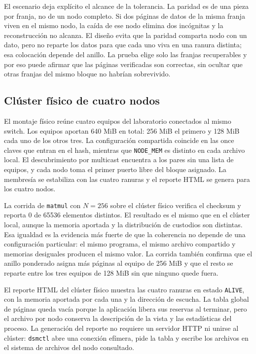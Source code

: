 El escenario deja explícito el alcance de la tolerancia. La paridad es de una pieza por franja, no de un nodo completo. Si dos páginas de datos de la misma franja viven en el mismo nodo, la caída de ese nodo elimina dos incógnitas y la reconstrucción no alcanza. El diseño evita que la paridad comparta nodo con un dato, pero no reparte los datos para que cada uno viva en una ranura distinta; esa colocación depende del anillo. La prueba elige solo las franjas recuperables y por eso puede afirmar que las páginas verificadas son correctas, sin ocultar que otras franjas del mismo bloque no habrían sobrevivido.

\subsection{Clúster físico de cuatro nodos}\label{sec:cluster-fisico}

El montaje físico reúne cuatro equipos del laboratorio conectados al mismo switch. Los equipos aportan 640 MiB en total: 256 MiB el primero y 128 MiB cada uno de los otros tres. La configuración compartida coincide en las once claves que entran en el hash, mientras que \texttt{NODE\_MEM} es distinto en cada archivo local. El descubrimiento por multicast encuentra a los pares sin una lista de equipos, y cada nodo toma el primer puerto libre del bloque asignado. La membresía se estabiliza con las cuatro ranuras y el reporte HTML se genera para los cuatro nodos.

La corrida de \texttt{matmul} con $N=256$ sobre el clúster físico verifica el checksum y reporta 0 de 65536 elementos distintos. El resultado es el mismo que en el clúster local, aunque la memoria aportada y la distribución de custodios son distintas. Esa igualdad es la evidencia más fuerte de que la coherencia no depende de una configuración particular: el mismo programa, el mismo archivo compartido y memorias desiguales producen el mismo valor. La corrida también confirma que el anillo ponderado asigna más páginas al equipo de 256 MiB y que el resto se reparte entre los tres equipos de 128 MiB sin que ninguno quede fuera.

El reporte HTML del clúster físico muestra las cuatro ranuras en estado \texttt{ALIVE}, con la memoria aportada por cada una y la dirección de escucha. La tabla global de páginas queda vacía porque la aplicación libera sus reservas al terminar, pero el archivo por nodo conserva la descripción de la vista y las estadísticas del proceso. La generación del reporte no requiere un servidor HTTP ni unirse al clúster: \texttt{dsmctl} abre una conexión efímera, pide la tabla y escribe los archivos en el sistema de archivos del nodo consultado.

